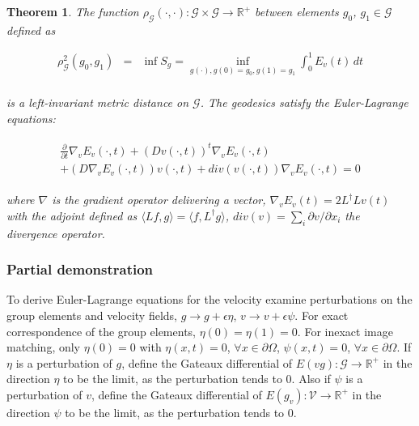 \documentclass[final, paper=letter,5p,times,twocolumn]{elsarticle}
\newtheorem{theorem}{Theorem} %
\theoremstyle{definition}
\begin{document}
{\begin{theorem}
  The function $\rho_{\mathcal{G}}(\cdot, \cdot): \mathcal{G} \times \mathcal{G} \rightarrow \mathbb{R}^{+}$ between elements $g_{0}$, $g_{1} \in \mathcal{G}$ defined as



\begin{eqnarray*}
  \rho_{\mathcal{G}}^{2}(g_{0}, g_{1}) & = & \inf S_{g} = \underset{g(\cdot), g(0)=g_{0}, g(1) = g_{1}}{\inf} \int_{0}^{1} E_{v}(t) \, dt \\
\end{eqnarray*}


is a left-invariant metric distance on $\mathcal{G}$. The geodesics satisfy the Euler-Lagrange equations:

\begin{eqnarray}
  \begin{array}{l}
  \frac{\partial}{\partial t} \nabla_{v}E_{v}(\cdot, t) + (Dv(\cdot, t))^{t} \nabla_{v}E_{v}(\cdot, t) \\
  + (D \nabla_{v}E_{v}(\cdot, t))v(\cdot, t) + div( v(\cdot, t)) \nabla_{v}E_{v}(\cdot, t) = 0
  \end{array}
  \label{Euler_Lagrange}
\end{eqnarray}

where $\nabla$ is the gradient operator delivering a vector, $\nabla_{v}E_{v}(t) = 2L^{\dag}Lv(t)$ with the adjoint defined as $\langle Lf, g\rangle = \langle f, L^{\dag}g \rangle$, $div(v) = \sum_{i} \partial v/ \partial x_{i}$ the divergence operator.
\end{theorem}



\subsubsection{Partial demonstration}

To derive Euler-Lagrange equations for the velocity examine perturbations on the group elements and velocity fields, $g \rightarrow g + \epsilon \eta$, $v \rightarrow v + \epsilon \psi$. For exact correspondence of the group elements, $\eta(0) = \eta(1) = 0$. For inexact image matching, only $\eta(0) = 0$ with $\eta(x, t) = 0$, $\forall x \in \partial \Omega$, $\psi(x, t) = 0$, $\forall x \in \partial \Omega$. If $\eta$ is a perturbation of $g$, define the Gateaux differential of $E(v g): \mathcal{G} \rightarrow \mathbb{R}^{+}$ in the direction $\eta$ to be the limit, as the perturbation tends to 0. Also if $\psi$ is a perturbation of $v$, define the Gateaux differential of $E(g_{v}): \mathcal{V} \rightarrow \mathbb{R}^{+}$ in the direction $\psi$ to be the limit, as the perturbation tends to 0.

}
\end{document}
